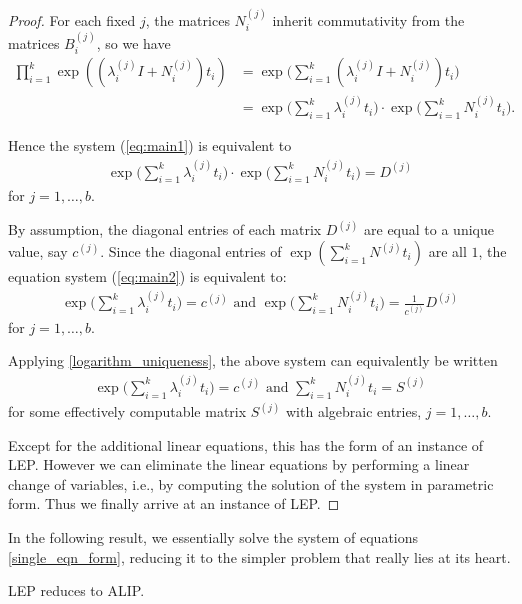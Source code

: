 \begin{proof}
For each fixed $j$, the matrices $N_{i}^{(j)}$ inherit commutativity from
the matrices $B^{(j)}_{i}$, so we have
\begin{align*}
\prod\limits_{i=1}^{k} \exp((\lambda_i^{(j)}I + N_i^{(j)})t_{i}) &=
   \exp\big(\sum_{i=1}^k (\lambda_i^{(j)}I  +
 N_i^{(j)}) t_i \big)\\
&= \exp\big(\sum_{i=1}^k \lambda_i^{(j)} t_i\big) \cdot
   \exp\big(\sum_{i=1}^k N_i^{(j)} t_i \big) .
\end{align*}

Hence the system (\ref{eq:main1}) is equivalent to
\begin{align}
\exp\big(\sum_{i=1}^k \lambda_i^{(j)} t_i\big) \cdot
   \exp\big(\sum_{i=1}^k N_i^{(j)} t_i \big)  = D^{(j)}
\label{eq:main2}
\end{align}
for $j=1,\ldots,b$.

By assumption, the diagonal entries of each matrix $D^{(j)}$ are
equal to a unique value, say $c^{(j)}$.
Since the diagonal entries of
$\exp\left(\sum_{i=1}^kN^{(j)}t_i\right)$
are all $1$, the equation system (\ref{eq:main2}) is equivalent to:
\begin{align*}
\exp\big(\sum_{i=1}^k \lambda_i^{(j)} t_i\big)
= c^{(j)} \mbox{ and }\exp\big(\sum_{i=1}^k N_i^{(j)} t_i \big)
=\frac{1}{c^{(j)}} D^{(j)}
\end{align*}
for $j=1,\ldots,b$.

Applying \cref{logarithm_uniqueness}, the
above system can equivalently be written
\begin{align*}
\exp\big(\sum_{i=1}^k \lambda_i^{(j)} t_i\big)
= c^{(j)} \mbox{ and } \sum_{i=1}^k
N_i^{(j)} t_i =
S^{(j)}
\end{align*}
for  some effectively computable matrix
$S^{(j)}$ with algebraic entries, $j=1,\ldots,b$.

Except for the additional linear equations, this has the form of an
instance of LEP.
 However we can eliminate the linear equations by
performing a linear change of variables, i.e., by computing the
solution of the system in parametric form.  Thus we finally arrive at
an instance of LEP.
\end{proof}


In the following result, we essentially solve the system of equations \ref{single_eqn_form}, reducing it to the simpler problem that really lies at its heart.

\begin{theorem}
\label{reference-for-log}
LEP reduces to ALIP.
\end{theorem}

